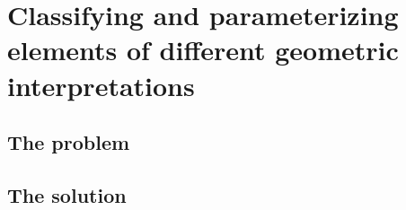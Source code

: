 \section{Classifying and parameterizing elements of different geometric interpretations}
\label{ch:research}

\subsection{The problem}
\label{sec:problem}

\subsection{The solution}
\label{sec:solution}
